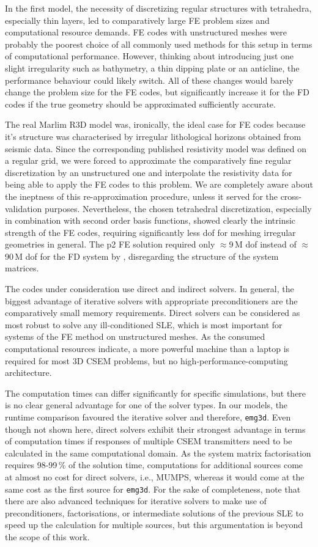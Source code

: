 \documentclass[
    paper,
  ]{geophysics}
\newcommand{\emg}[2]{\texttt{emg#1#2}\xspace}
\begin{document}
In the first model, the necessity of discretizing regular structures with tetrahedra, especially thin layers, led to comparatively large FE problem sizes and computational resource demands. FE codes with unstructured meshes were probably the poorest choice of all commonly used methods for this setup in terms of computational performance. However, thinking about introducing just one slight irregularity such as bathymetry, a thin dipping plate or an anticline, the performance behaviour could likely switch. All of these changes would barely change the problem size for the FE codes, but significantly increase it for the FD codes if the true geometry should be approximated sufficiently accurate.

The real Marlim R3D model was, ironically, the ideal case for FE codes because it's structure was characterised by irregular lithological horizons obtained from seismic data. Since the corresponding published resistivity model was defined on a regular grid, we were forced to approximate the comparatively fine regular discretization by an unstructured one and interpolate the resistivity data for being able to apply the FE codes to this problem. We are completely aware about the ineptness of this re-approximation procedure, unless it served for the cross-validation purposes. Nevertheless, the chosen tetrahedral discretization, especially in combination with second order basis functions, showed clearly the intrinsic strength of the FE codes, requiring significantly less dof for meshing irregular geometries in general. The p2 FE solution required only $\approx$9\,M dof instead of $\approx$90\,M dof for the FD system by \citet{GEO.19.Correa}, disregarding the structure of the system matrices.

The codes under consideration use direct and indirect solvers. In general, the biggest advantage of iterative solvers with appropriate preconditioners are the comparatively small memory requirements. Direct solvers can be considered as most robust to solve any ill-conditioned SLE, which is most important for systems of the FE method on unstructured meshes. As the consumed computational resources indicate, a more powerful machine than a laptop is required for most 3D CSEM problems, but no high-performance-computing architecture.

The computation times can differ significantly for specific simulations, but there is no clear general advantage for one of the solver types. In our models, the runtime comparison favoured the iterative solver and therefore, \emg3d. Even though not shown here, direct solvers exhibit their strongest advantage in terms of computation times if responses of multiple CSEM transmitters need to be calculated in the same computational domain. As the system matrix factorisation requires 98-99\,\% of the solution time, computations for additional sources come at almost no cost for direct solvers, i.e., MUMPS, whereas it would come at the same cost as the first source for \emg3d. For the sake of completeness, note that there are also advanced techniques for iterative solvers to make use of preconditioners, factorisations, or intermediate solutions of the previous SLE to speed up the calculation for multiple sources, but this argumentation is beyond the scope of this work.
\end{document}
